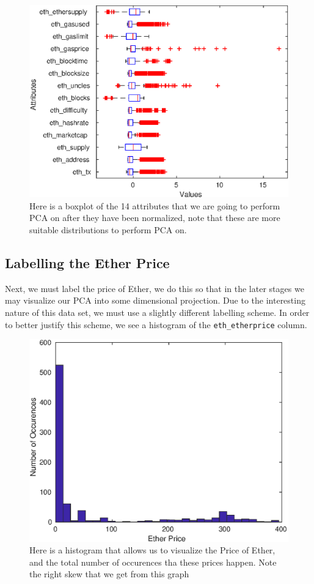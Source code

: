\documentclass{article}
\begin{document}
\begin{figure}[H]
\centering
\caption{Here is a boxplot of the 14 attributes that we are going to perform PCA on after they have been normalized, note that these are more suitable distributions to perform PCA on.}
\includegraphics[scale = 0.9]{main/boxplot_after_norm.eps}
\end{figure}


\subsection{Labelling the Ether Price}
Next, we must label the price of Ether, we do this so that in the later stages we may visualize our PCA into some dimensional projection. Due to the interesting nature of this data set, we must use a slightly different labelling scheme. In order to better justify this scheme, we see a histogram of the \texttt{eth\_etherprice} column.

\begin{figure}[H]
\centering
\caption{Here is a histogram that allows us to visualize the Price of Ether, and the total number of occurences tha these prices happen. Note the right skew that we get from this graph}
\includegraphics{main/eth_priceOnly_noYMax.eps}
\end{figure}
\end{document}

